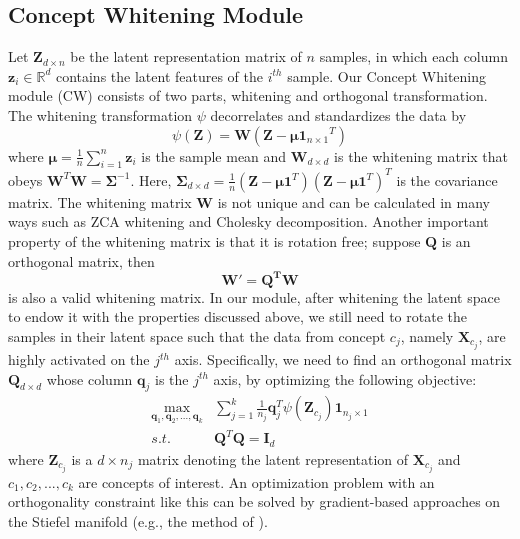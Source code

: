 \documentclass{article}
\begin{document}
\subsection{Concept Whitening Module}
\label{sec:CW}
Let $\mathbf{Z}_{d \times n}$ be the latent representation matrix of $n$ samples, in which each column $\mathbf{z}_i\in \mathbb{R}^d$ contains the latent features of the $i^{th}$ sample. Our Concept Whitening module (CW) consists of two parts, whitening and orthogonal transformation. The whitening transformation $\psi$ decorrelates and standardizes the data by
\begin{equation}
    \psi(\mathbf{Z}) = \mathbf{W}(\mathbf{Z}-\mathbf{\mu}{\mathbf{1}_{n\times 1}}^T)
\end{equation}
where $\mathbf{\mu}=\frac{1}{n}\sum_{i=1}^{n}\mathbf{z}_i$ is the sample mean and $\mathbf{W}_{d \times d}$ is the whitening matrix that obeys $\mathbf{W}^T\mathbf{W}=\mathbf{\Sigma}^{-1}$. Here, $\mathbf{\Sigma}_{d \times d}=\frac{1}{n}(\mathbf{Z}-\mathbf{\mu}\mathbf{1}^T)(\mathbf{Z}-\mathbf{\mu}\mathbf{1}^T)^T$ is the covariance matrix. The whitening matrix $\mathbf{W}$ is not unique and can be calculated in many ways such as ZCA whitening and Cholesky decomposition. Another important property of the whitening matrix is that it is rotation free; suppose $\mathbf{Q}$ is an orthogonal matrix, then
\begin{equation}
    \mathbf{W'}=\mathbf{Q^TW}
\end{equation}
is also a valid whitening matrix. In our module, after whitening the latent space to endow it with the properties discussed above, we still need to rotate the samples in their latent space such that the data from concept $c_j$, namely $\mathbf{X}_{c_j}$, are highly activated on the $j^{th}$ axis. Specifically, we need to find an orthogonal matrix $\mathbf{Q}_{d \times d}$ whose column $\mathbf{q}_j$ is the $j^{th}$ axis, by optimizing the following objective:
\begin{equation}
    \begin{aligned}
        \max_{\mathbf{q}_1,\mathbf{q}_2,...,\mathbf{q}_k}  &\sum_{j=1}^{k}\frac{1}{n_j}\mathbf{q}_j^T\psi(\mathbf{Z}_{c_j})\mathbf{1}_{n_j\times 1} \\
        s.t.\ &\mathbf{Q}^T\mathbf{Q}=\mathbf{I}_d
    \end{aligned}
\end{equation}
where $\mathbf{Z}_{c_j}$ is a $d \times n_j$ matrix denoting the latent representation of $\mathbf{X}_{c_j}$ and $c_1,c_2, ...,c_k$ are concepts of interest. An optimization problem with an orthogonality constraint like this can be solved by gradient-based approaches on the Stiefel manifold (e.g., the method of \cite{wen2013feasible}).
\end{document}

